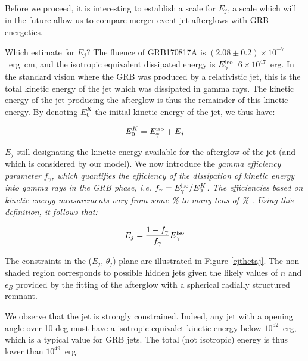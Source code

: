 Before we proceed, it is interesting to establish a scale for $E_j$, a scale which will in the future allow us to compare merger event jet afterglows with GRB energetics.

Which estimate for $E_j$? The fluence of GRB170817A is $(2.08\pm0.2)\times10^{-7}$~erg~cm, and the isotropic equivalent dissipated energy is $E^{\rm{iso}}_\gamma$~$6 \times 10^{47}$~erg. In the standard vision where the GRB was produced by a relativistic jet, this is the total kinetic energy of the jet which was dissipated in gamma rays. The kinetic energy of the jet producing the afterglow is thus the remainder of this kinetic energy. By denoting $E^K_0$ the initial kinetic energy of the jet, we thus have:

\begin{equation}E^K_0 = E^{\rm{iso}}_\gamma + E_j\end{equation}

$E_j$ still designating the kinetic energy available for the afterglow of the jet (and which is considered by our model). We now introduce the \it{gamma efficiency} parameter $f_\gamma$, which quantifies the efficiency of the dissipation of kinetic energy into gamma rays in the GRB phase, i.e. $f_\gamma = E^{\rm{iso}}_\gamma/E^K_0$. The efficiencies based on kinetic energy measurements vary from some \% to many tens of \% \citep{47,48}. Using this definition, it follows that:

\begin{equation}E_j = \frac{1 - f_\gamma}{f_\gamma} E^{\rm{iso}}_\gamma \end{equation}

The constraints in the ($E_j$, $\theta_j$) plane are illustrated in Figure \ref{ejthetaj}. The non-shaded region corresponds to possible hidden jets given the likely values of $n$ and $\epsilon_B$ provided by the fitting of the afterglow with a spherical radially structured remnant.


We observe that the jet is strongly constrained. Indeed, any jet with a opening angle over 10 deg must have a isotropic-equivalet kinetic energy below $10^{52}$~erg, which is a typical value for GRB jets. The total (not isotropic) energy is thus lower than $10^49$~erg.

